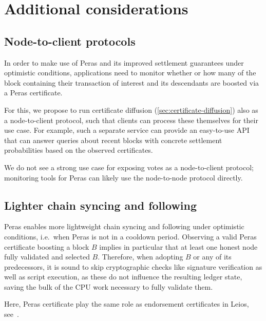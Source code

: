 \section{Additional considerations}

\subsection{Node-to-client protocols}

In order to make use of Peras and its improved settlement guarantees under optimistic conditions, applications need to monitor whether or how many of the block containing their transaction of interest and its descendants are boosted via a Peras certificate.

For this, we propose to run certificate diffusion (\cref{sec:certificate-diffusion}) also as a node-to-client protocol, such that clients can process these themselves for their use case.
For example, such a separate service can provide an easy-to-use API that can answer queries about recent blocks with concrete settlement probabilities based on the observed certificates.

We do not see a strong use case for exposing votes as a node-to-client protocol; monitoring tools for Peras can likely use the node-to-node protocol directly.

\subsection{Lighter chain syncing and following}

Peras enables more lightweight chain syncing and following under optimistic conditions, i.e.\ when Peras is not in a cooldown period.
Observing a valid Peras certificate boosting a block $B$ implies in particular that at least one honest node fully validated and selected $B$.
Therefore, when adopting $B$ or any of its predecessors, it is sound to skip cryptographic checks like signature verification as well as script execution, as these do not influence the resulting ledger state, saving the bulk of the CPU work necessary to fully validate them.

Here, Peras certificate play the same role as endorsement certificates in Leios, see~\cite[Section 4.4.2]{leios-design-goals-concepts}.

